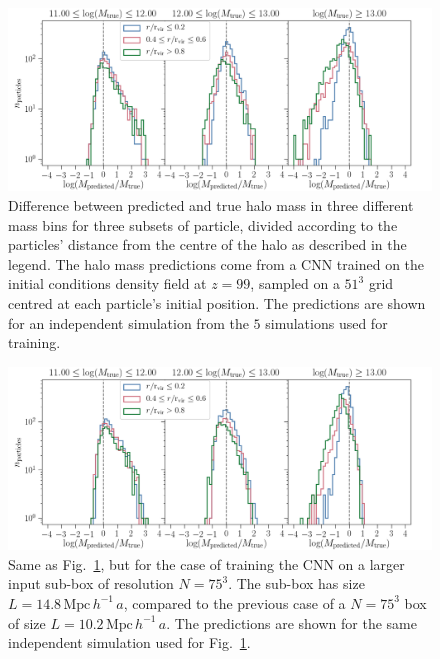 \documentclass[11pt]{article}
\begin{document}
\begin{figure}[t]
\centering
\includegraphics[width=\columnwidth]{z99/histogram_radii.png}
\caption{Difference between predicted and true halo mass in three different mass bins for three subsets of particle, divided according to the particles' distance from the centre of the halo as described in the legend. The halo mass predictions come from a CNN trained on the initial conditions density field at $z=99$, sampled on a $51^3$ grid centred at each particle's initial position. The predictions are shown for an independent simulation from the $5$ simulations used for training.}
\label{fig:z99_predictions}
\end{figure}

\begin{figure}
\centering
\includegraphics[width=\columnwidth]{z99/predictions_mass_and_radius_bins_ics_res75.png}
\caption{Same as Fig.~\ref{fig:z99_predictions}, but for the case of training the CNN on a larger input sub-box of resolution $N=75^3$. The sub-box has size $L=14.8 \, \mathrm{Mpc} \, h^{-1} \, a$, compared to the previous case of a $N=75^3$ box of size $L = 10.2 \, \mathrm{Mpc} \, h^{-1} \, a$. The predictions are shown for the same independent simulation used for Fig.~\ref{fig:z99_predictions}.}
\label{fig:z99_predictions_res75}
\end{figure}
\end{document}

